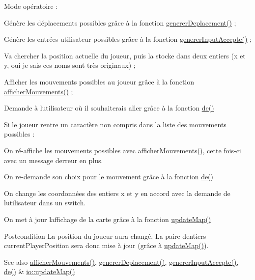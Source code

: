 Mode opératoire \+:
\begin{DoxyItemize}
\item Génère les déplacements possibles grâce à la fonction {\ttfamily \hyperlink{classjeu_a58d74300f8d64b3d3cd151e0838ef232}{generer\+Deplacement()}} ;
\item Génère les entrées utilisateur possibles grâce à la fonction {\ttfamily \hyperlink{classjeu_ae186e98661e72378c9e659ffcf7a7deb}{generer\+Input\+Accepte()}} ;
\item Va chercher la position actuelle du joueur, puis la stocke dans deux entiers ({\ttfamily x} et {\ttfamily y}, oui je sais ces noms sont très originaux) ;
\item Afficher les mouvements possibles au joueur grâce à la fonction {\ttfamily \hyperlink{namespaceio_ac60b7c3503eb53e69a2adc86368ab633}{afficher\+Mouvements()}} ;
\item Demande à l\textquotesingle{}utilisateur où il souhaiterais aller grâce à la fonction {\ttfamily \hyperlink{namespaceio_ae9908b55f26f07e78043d7cfad003d22}{de()}}
\item Si le joueur rentre un caractère non compris dans la liste des mouvements possibles \+:
\begin{DoxyItemize}
\item On ré-\/affiche les mouvements possibles avec {\ttfamily \hyperlink{namespaceio_ac60b7c3503eb53e69a2adc86368ab633}{afficher\+Mouvements()}}, cette fois-\/ci avec un message d\textquotesingle{}erreur en plus.
\item On re-\/demande son choix pour le mouvement grâce à la fonction {\ttfamily \hyperlink{namespaceio_ae9908b55f26f07e78043d7cfad003d22}{de()}}
\end{DoxyItemize}
\item On change les coordonnées des entiers {\ttfamily x} et {\ttfamily y} en accord avec la demande de l\textquotesingle{}utilisateur dans un {\ttfamily switch}.
\item On met à jour l\textquotesingle{}affichage de la carte grâce à la fonction {\ttfamily \hyperlink{namespaceio_ae9438bfe8b2631be82b0f4d644358545}{update\+Map()}} \begin{DoxyPostcond}{Postcondition}
La position du joueur aura changé. La paire d\textquotesingle{}entiers {\ttfamily current\+Player\+Position} sera donc mise à jour (grâce à {\ttfamily \hyperlink{namespaceio_ae9438bfe8b2631be82b0f4d644358545}{update\+Map()}}). 
\end{DoxyPostcond}
\begin{DoxySeeAlso}{See also}
\hyperlink{namespaceio_ac60b7c3503eb53e69a2adc86368ab633}{afficher\+Mouvements()}, \hyperlink{classjeu_a58d74300f8d64b3d3cd151e0838ef232}{generer\+Deplacement()}, \hyperlink{classjeu_ae186e98661e72378c9e659ffcf7a7deb}{generer\+Input\+Accepte()}, \hyperlink{namespaceio_ae9908b55f26f07e78043d7cfad003d22}{de()} \& \hyperlink{namespaceio_ae9438bfe8b2631be82b0f4d644358545}{io\+::update\+Map()} 
\end{DoxySeeAlso}

\end{DoxyItemize}\mbox{\label{classjeu_aa6163ba51f80fa944374fc1b85021268}} 
